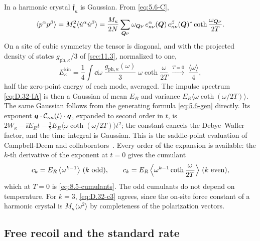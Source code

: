 In a harmonic crystal $\mathfrak{f}_\kappa$ is Gaussian. From \cref{eq:5.6-C},
\begin{equation*}
  \langle p^\alpha p^\beta\rangle = M_\kappa^2\langle\dot u^\alpha\dot u^\beta\rangle = \frac{M_\kappa}{2N}\sum_{\bm{Q}\nu}\omega_{\bm{Q}\nu}\,e^\alpha_{\kappa\nu}(\bm{Q})\,e^\beta_{\kappa\nu}(\bm{Q})^*\coth\frac{\omega_{\bm{Q}\nu}}{2T} .
\end{equation*}
On a site of cubic symmetry the tensor is diagonal, and with the projected density of states $g_{\mathrm{ph},\kappa}/3$ of \cref{sec:11.3}, normalized to one,
\begin{equation}
  E^{\mathrm{kin}}_\kappa = \frac14\int\dd\omega\;\frac{g_{\mathrm{ph},\kappa}(\omega)}{3}\;\omega\coth\frac{\omega}{2T} \;\xrightarrow{T = 0}\; \frac{\langle\omega\rangle}{4} ,
  \label{eq:D.32-Ekin}
\end{equation}
half the zero-point energy of each mode, averaged. The impulse spectrum \cref{eq:D.32-IA} is then a Gaussian of mean $E_R$ and variance $E_R\langle\omega\coth(\omega/2T)\rangle$. The same Gaussian follows from the generating formula \cref{eq:5.6-gen} directly. Its exponent $\bm{q}\cdot\mathcal{C}_{\kappa\kappa}(t)\cdot\bm{q}$, expanded to second order in $t$, is $2W_\kappa - \ii E_Rt - \frac12E_R\langle\omega\coth(\omega/2T)\rangle t^2$; the constant cancels the Debye--Waller factor, and the time integral is Gaussian. This is the saddle-point evaluation of Campbell-Deem and collaborators~\cite[Eqs.~(37)--(39) and App.~B]{campbelldeem2022dark}. Every order of the expansion is available: the $k$-th derivative of the exponent at $t = 0$ gives the cumulant
\begin{equation}
  c_k = E_R\,\bigl\langle\omega^{k-1}\bigr\rangle\ (k\ \text{odd}) , \qquad c_k = E_R\,\Bigl\langle\omega^{k-1}\coth\frac{\omega}{2T}\Bigr\rangle\ (k\ \text{even}) ,
  \label{eq:D.32-ck}
\end{equation}
which at $T = 0$ is \cref{eq:8.5-cumulants}. The odd cumulants do not depend on temperature. For $k = 3$, \cref{eq:D.32-c3} agrees, since the on-site force constant of a harmonic crystal is $M_\kappa\langle\omega^2\rangle$ by completeness of the polarization vectors.

\subsection{Free recoil and the standard rate}

